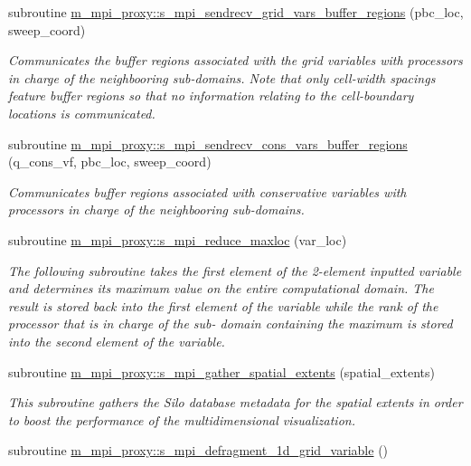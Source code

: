 \begin{Indent}
\begin{DoxyCompactItemize}
subroutine \hyperlink{namespacem__mpi__proxy_a8e48d59a04981a6594f25ad7a7562492}{m\+\_\+mpi\+\_\+proxy\+::s\+\_\+mpi\+\_\+sendrecv\+\_\+grid\+\_\+vars\+\_\+buffer\+\_\+regions} (pbc\+\_\+loc, sweep\+\_\+coord)
\begin{DoxyCompactList}\small\item\em Communicates the buffer regions associated with the grid variables with processors in charge of the neighbooring sub-\/domains. Note that only cell-\/width spacings feature buffer regions so that no information relating to the cell-\/boundary locations is communicated. \end{DoxyCompactList}\item 
subroutine \hyperlink{namespacem__mpi__proxy_a4d7ec0d1976967504babdf44ec83c1b1}{m\+\_\+mpi\+\_\+proxy\+::s\+\_\+mpi\+\_\+sendrecv\+\_\+cons\+\_\+vars\+\_\+buffer\+\_\+regions} (q\+\_\+cons\+\_\+vf, pbc\+\_\+loc, sweep\+\_\+coord)
\begin{DoxyCompactList}\small\item\em Communicates buffer regions associated with conservative variables with processors in charge of the neighbooring sub-\/domains. \end{DoxyCompactList}\item 
subroutine \hyperlink{namespacem__mpi__proxy_adaa028bb99f844487de8d6e4507e7734}{m\+\_\+mpi\+\_\+proxy\+::s\+\_\+mpi\+\_\+reduce\+\_\+maxloc} (var\+\_\+loc)
\begin{DoxyCompactList}\small\item\em The following subroutine takes the first element of the 2-\/element inputted variable and determines its maximum value on the entire computational domain. The result is stored back into the first element of the variable while the rank of the processor that is in charge of the sub-\/ domain containing the maximum is stored into the second element of the variable. \end{DoxyCompactList}\item 
subroutine \hyperlink{namespacem__mpi__proxy_ab2ced8f095b812fcc355539c2c5fa162}{m\+\_\+mpi\+\_\+proxy\+::s\+\_\+mpi\+\_\+gather\+\_\+spatial\+\_\+extents} (spatial\+\_\+extents)
\begin{DoxyCompactList}\small\item\em This subroutine gathers the Silo database metadata for the spatial extents in order to boost the performance of the multidimensional visualization. \end{DoxyCompactList}\item 
subroutine \hyperlink{namespacem__mpi__proxy_ac15a15ba12e6110bb015af0ece5bba47}{m\+\_\+mpi\+\_\+proxy\+::s\+\_\+mpi\+\_\+defragment\+\_\+1d\+\_\+grid\+\_\+variable} ()

\end{DoxyCompactItemize}
\end{Indent}
